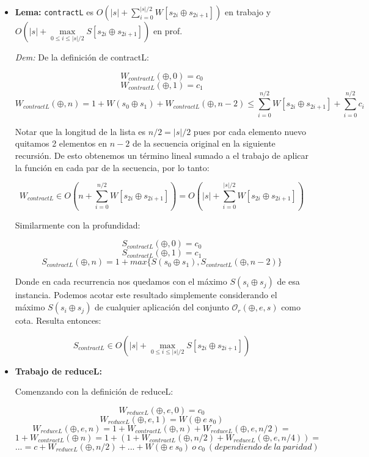 \documentclass[12pt]{article}
\begin{document}
\begin{itemize}

\item \textbf{Lema:} \texttt{contractL} es $O(|s| + \sum\limits_{i=0}^{|s|/2} W[s_{2i} \oplus s_{2i+1}])$ en trabajo y $O(|s| + \max\limits_{0 \leq i \leq |s|/2} S[s_{2i} \oplus s_{2i+1}])$ en prof.

 \textit{Dem:} 
    De la definición de contractL:
    
    $$ W_{contractL}(\oplus, 0) = c_0 $$
    $$ W_{contractL}(\oplus, 1) = c_1 $$
    $$ W_{contractL}(\oplus, n) = 1 + W(s_0 \oplus s_1) + W_{contractL}(\oplus, n-2) \leq \sum\limits_{i=0}^{n/2} W[s_{2i} \oplus s_{2i+1}] + \sum\limits_{i=0}^{n/2} c_i $$
    
    Notar que la longitud de la lista es $n/2 = |s|/2$ pues por cada elemento nuevo quitamos 2 elementos en $n-2$ de la secuencia original en la siguiente recursión. De esto obtenemos un término lineal sumado a el trabajo de aplicar la función en cada par de la secuencia, por lo tanto:
    
    $$ W_{contractL} \in O(n + \sum\limits_{i=0}^{n/2} W[s_{2i} \oplus s_{2i+1}]) = O(|s| + \sum\limits_{i=0}^{|s|/2} W[s_{2i} \oplus s_{2i+1}]) $$
    
    Similarmente con la profundidad:
    
    $$ S_{contractL}(\oplus, 0) = c_0 $$
    $$ S_{contractL}(\oplus, 1) = c_1 $$
    $$ S_{contractL}(\oplus, n) = 1 + max\{ S(s_0 \oplus s_1), S_{contractL}(\oplus, n-2) \} $$
    
    Donde en cada recurrencia nos quedamos con el máximo $S(s_i \oplus s_j)$ de esa instancia. Podemos acotar este resultado simplemente considerando el máximo $S(s_i \oplus s_j)$ de cualquier aplicación del conjunto $\mathcal{O}_r(\oplus,e,s)$ como cota. Resulta entonces:
    
    $$ S_{contractL} \in O(|s| + \max\limits_{0 \leq i \leq |s|/2} S[s_{2i} \oplus s_{2i+1}]) $$

\item \textbf{Trabajo de reduceL:}

    Comenzando con la definición de reduceL:

    $$ W_{reduceL}(\oplus, e, 0) = c_0 $$
    $$ W_{reduceL}(\oplus, e, 1) = W(\oplus\ e\ s_0) $$
    $$ W_{reduceL}(\oplus, e, n) = 1 + W_{contractL}(\oplus, n) + W_{reduceL}(\oplus, e, n/2) = $$
    $$ 1 + W_{contractL}(\oplus\ n) = 1 + ( 1 + W_{contractL}(\oplus, n/2) + W_{reduceL}(\oplus, e, n/4) ) = $$
    $$ ... = c + W_{reduceL}(\oplus, n/2) + ... + W(\oplus\ e\ s_0)\ o\ c_0\ (dependiendo\ de\ la\ paridad) $$ 
    

\end{itemize}
\end{document}

